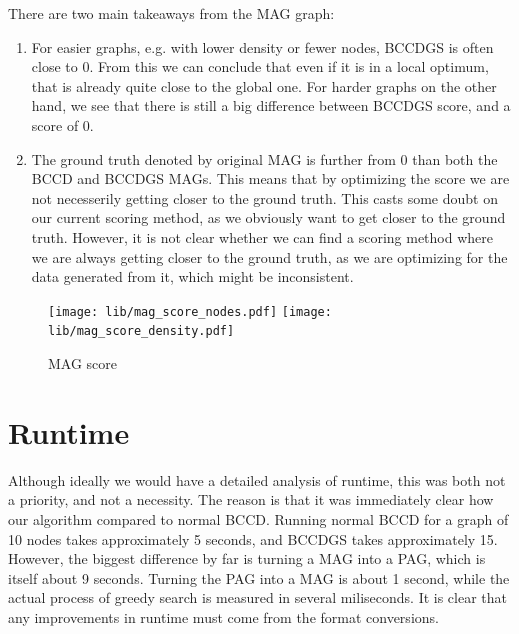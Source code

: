 \documentclass[11pt,a4paper]{report}
\begin{document}
There are two main takeaways from the MAG graph:
\begin{enumerate}
  \item For easier graphs, e.g. with lower density or fewer nodes, BCCDGS
    is often close to 0. From this we can conclude that even if it is in a
    local optimum, that is already quite close to the global one.
    For harder graphs on the other hand, we see that there is still a big
    difference between BCCDGS score, and a score of 0.

  \item The ground truth denoted by original MAG is further from 0 than
    both the BCCD and BCCDGS MAGs. This means that by optimizing the score
    we are not necesserily getting closer to the ground truth. This casts
    some doubt on our current scoring method, as we obviously want to get
    closer to the ground truth. However, it is not clear whether we can
    find a scoring method where we are always getting closer to the ground
    truth, as we are optimizing for the data generated from it, which
    might be inconsistent.

\end{enumerate}

\begin{figure}
  \centering
  \texttt{[image: lib/mag\_score\_nodes.pdf]}
  \texttt{[image: lib/mag\_score\_density.pdf]}
  \caption{MAG score}
  \label{fig:mag_score}
\end{figure}

\section{Runtime}\label{runtime}
Although ideally we would have a detailed analysis of runtime, this was
both not a priority, and not a necessity. The reason is that it was
immediately clear how our algorithm compared to normal BCCD. Running
normal BCCD for a graph of 10 nodes takes approximately 5 seconds, and
BCCDGS takes approximately 15. However, the biggest difference by far is
turning a MAG into a PAG, which is itself about 9 seconds. Turning the PAG
into a MAG is about 1 second, while the actual process of greedy search is
measured in several miliseconds. It is clear that any improvements in
runtime must come from the format conversions.

\end{document}
